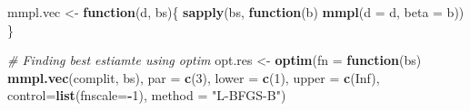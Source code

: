 \documentclass[
]{article}
\newenvironment{Shaded}{\begin{snugshade}}{\end{snugshade}}
\newcommand{\CommentTok}[1]{\textcolor[rgb]{0.56,0.35,0.01}{\textit{#1}}}
\newcommand{\ControlFlowTok}[1]{\textcolor[rgb]{0.13,0.29,0.53}{\textbf{#1}}}
\newcommand{\DataTypeTok}[1]{\textcolor[rgb]{0.13,0.29,0.53}{#1}}
\newcommand{\DecValTok}[1]{\textcolor[rgb]{0.00,0.00,0.81}{#1}}
\newcommand{\KeywordTok}[1]{\textcolor[rgb]{0.13,0.29,0.53}{\textbf{#1}}}
\newcommand{\NormalTok}[1]{#1}
\newcommand{\OperatorTok}[1]{\textcolor[rgb]{0.81,0.36,0.00}{\textbf{#1}}}
\newcommand{\OtherTok}[1]{\textcolor[rgb]{0.56,0.35,0.01}{#1}}
\newcommand{\StringTok}[1]{\textcolor[rgb]{0.31,0.60,0.02}{#1}}
\begin{document}
\begin{Shaded}
\begin{Highlighting}[]
\NormalTok{mmpl.vec <-}\StringTok{ }\ControlFlowTok{function}\NormalTok{(d, bs)\{}
  \KeywordTok{sapply}\NormalTok{(bs, }\ControlFlowTok{function}\NormalTok{(b) }\KeywordTok{mmpl}\NormalTok{(}\DataTypeTok{d =}\NormalTok{ d, }\DataTypeTok{beta =}\NormalTok{ b))}
\NormalTok{\}}

\CommentTok{# Finding best estiamte using optim}
\NormalTok{opt.res <-}\StringTok{ }\KeywordTok{optim}\NormalTok{(}\DataTypeTok{fn =} \ControlFlowTok{function}\NormalTok{(bs) }\KeywordTok{mmpl.vec}\NormalTok{(complit, bs),}
      \DataTypeTok{par =} \KeywordTok{c}\NormalTok{(}\DecValTok{3}\NormalTok{),}
      \DataTypeTok{lower =} \KeywordTok{c}\NormalTok{(}\DecValTok{1}\NormalTok{),}
      \DataTypeTok{upper =} \KeywordTok{c}\NormalTok{(}\OtherTok{Inf}\NormalTok{),}
      \DataTypeTok{control=}\KeywordTok{list}\NormalTok{(}\DataTypeTok{fnscale=}\OperatorTok{-}\DecValTok{1}\NormalTok{),}
      \DataTypeTok{method =} \StringTok{"L-BFGS-B"}\NormalTok{)}
\end{Highlighting}
\end{Shaded}
\end{document}
